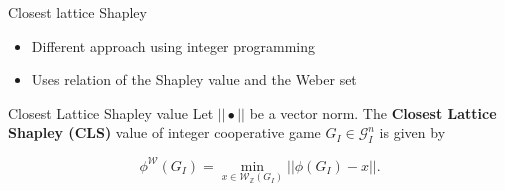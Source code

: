 \documentclass{beamer}
\newcommand{\Z}{\mathbb{Z}}
\begin{document}


\begin{frame}{Closest lattice Shapley}
    \begin{itemize}
        \item Different approach using integer programming
        \item Uses relation of the Shapley value and the Weber set
    \end{itemize}


    \begin{block}{Closest Lattice Shapley value}
        Let $||\bullet||$ be a vector norm. The \textbf{Closest Lattice Shapley (CLS)} value of integer cooperative game $G_I \in \mathcal{G}_I^n$ is given by

        \begin{displaymath}
            \phi^\mathcal{W}(G_I)  = \min_{x \in \mathcal{W}_\Z(G_I)} ||\phi(G_I) - x||.
        \end{displaymath}
    \end{block}
\end{frame}


\end{document}
